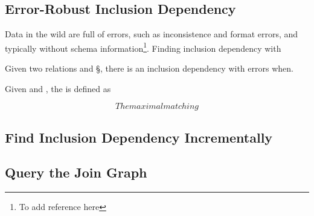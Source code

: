 





\subsection{Error-Robust Inclusion Dependency}\label{subsec:eind}

Data in the wild are full of errors, such as inconsistence and format errors, and typically without schema information\footnote{To add reference here}. Finding inclusion dependency with 

\begin{definition}
Given two relations \R and \S, there is an inclusion dependency with errors when.
\end{definition}

Given \X and \Y, the is defined as 

$$The maximal matching$$


\subsection{Find Inclusion Dependency Incrementally}\label{subsec:incremental}







\subsection{Query the Join Graph}\label{subsec:query}


